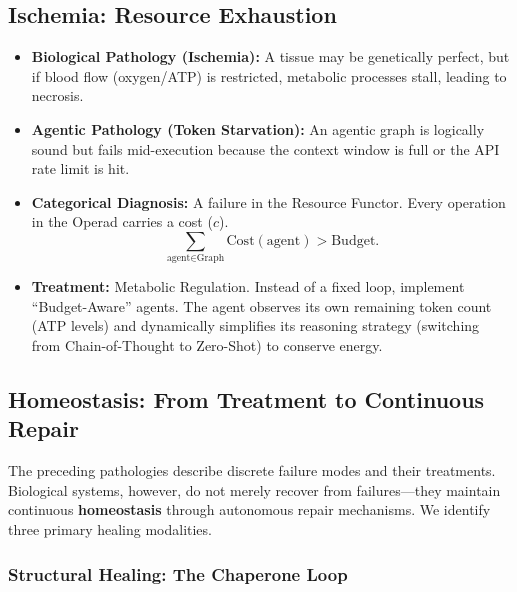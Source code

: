 \subsection{Ischemia: Resource Exhaustion}

\begin{itemize}[leftmargin=*]
\item \textbf{Biological Pathology (Ischemia):} A tissue may be genetically perfect, but if blood flow
(oxygen/ATP) is restricted, metabolic processes stall, leading to necrosis.
\item \textbf{Agentic Pathology (Token Starvation):} An agentic graph is logically sound but fails mid-execution
because the context window is full or the API rate limit is hit.
\item \textbf{Categorical Diagnosis:} A failure in the Resource Functor. Every operation in the Operad carries a
cost ($c$).
\begin{equation}
\sum_{\text{agent}\in \text{Graph}} \mathrm{Cost}(\text{agent}) > \mathrm{Budget}.
\label{eq:budget-overflow}
\end{equation}
\item \textbf{Treatment:} Metabolic Regulation. Instead of a fixed loop, implement ``Budget-Aware'' agents. The
agent observes its own remaining token count (ATP levels) and dynamically simplifies its reasoning strategy
(switching from Chain-of-Thought to Zero-Shot) to conserve energy.
\end{itemize}

\subsection{Homeostasis: From Treatment to Continuous Repair}

The preceding pathologies describe discrete failure modes and their treatments. Biological systems,
however, do not merely recover from failures---they maintain continuous \textbf{homeostasis} through
autonomous repair mechanisms. We identify three primary healing modalities.

\subsubsection{Structural Healing: The Chaperone Loop}

